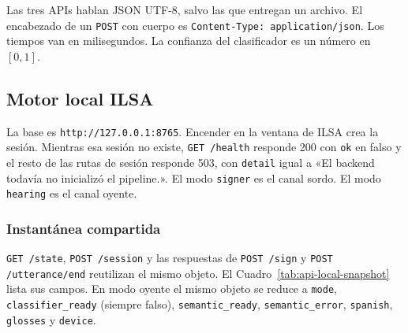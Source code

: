 Las tres APIs hablan JSON UTF-8, salvo las que entregan un archivo. El encabezado de un \texttt{POST} con cuerpo es \texttt{Content-Type: application/json}. Los tiempos van en milisegundos. La confianza del clasificador es un número en $[0, 1]$.

\subsection{Motor local ILSA}
\label{sec:contrato-api-local}

La base es \texttt{http://127.0.0.1:8765}. Encender en la ventana de ILSA crea la sesión. Mientras esa sesión no existe, \texttt{GET /health} responde 200 con \texttt{ok} en falso y el resto de las rutas de sesión responde 503, con \texttt{detail} igual a «El backend todavía no inicializó el pipeline.». El modo \texttt{signer} es el canal sordo. El modo \texttt{hearing} es el canal oyente.
\subsubsection{Instantánea compartida}

\texttt{GET /state}, \texttt{POST /session} y las respuestas de \texttt{POST /sign} y \texttt{POST /utterance/end} reutilizan el mismo objeto. El Cuadro~\ref{tab:api-local-snapshot} lista sus campos. En modo oyente el mismo objeto se reduce a \texttt{mode}, \texttt{classifier\_ready} (siempre falso), \texttt{semantic\_ready}, \texttt{semantic\_error}, \texttt{spanish}, \texttt{glosses} y \texttt{device}.

